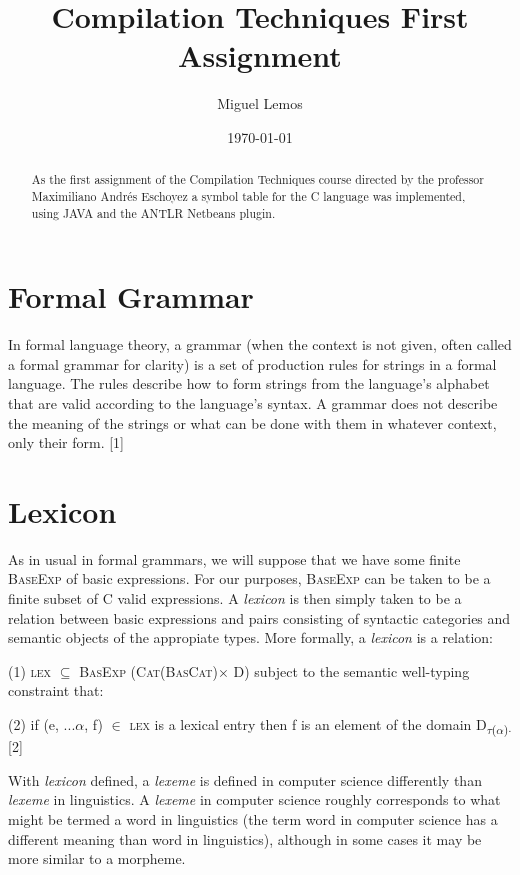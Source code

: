 \documentclass[twocolumn,10ptr]{article}
\author{Miguel Lemos}
\date{\today}
\title{Compilation Techniques First Assignment}
\begin{document}
\twocolumn
\setlength{\columnsep}{20pt}
\maketitle

\begin{abstract}
    As the first assignment of the Compilation Techniques course directed by the professor Maximiliano Andr\'{e}s Eschoyez a symbol table for the C language was implemented, using JAVA and the ANTLR Netbeans plugin.
\end{abstract}



\section{Formal Grammar}
In formal language theory, a grammar (when the context is not given, often called a formal grammar for clarity) is a set of production rules for strings in a formal language. The rules describe how to form strings from the language's alphabet that are valid according to the language's syntax. A grammar does not describe the meaning of the strings or what can be done with them in whatever context, only their form.
[1]



\section{Lexicon}
As in usual in formal grammars, we will suppose that we have some finite \textsc{BaseExp} of basic expressions. For our purposes, \textsc{BaseExp}  can be taken to be a finite subset of   C valid expressions. A \textit{lexicon} is then simply taken to be a relation between basic expressions and pairs consisting of syntactic categories and semantic objects of the appropiate types.
More formally, a \textit{lexicon} is a relation:

(1) \textsc{ lex} \( \subseteq \)  \textsc{ BasExp} (\textsc{Cat}(\textsc{BasCat})\(\times\) D)
subject to the semantic well-typing constraint that:

(2) if (e, ...\( \alpha \), f) \( \in \)   \textsc{ lex} is a lexical entry then f is an element of the domain D\textsubscript{\(\tau \)(\( \alpha \))\(\cdot\)} [2]

With \textit{lexicon} defined, a \textit{lexeme} is defined in computer science differently than  \textit{lexeme}  in linguistics. A  \textit{lexeme}  in computer science roughly corresponds to what might be termed a word in linguistics (the term word in computer science has a different meaning than word in linguistics), although in some cases it may be more similar to a morpheme.
\end{document}
